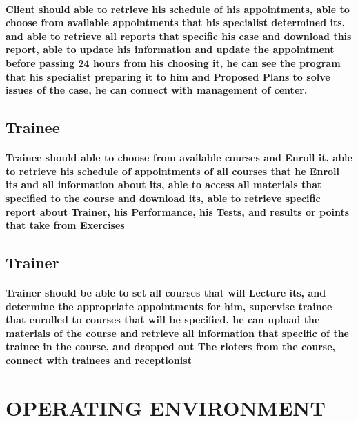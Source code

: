 \documentclass[../Psychological_system_web_application.tex]{subfiles}
\begin{document}
			\paragraph{Client should able to retrieve his schedule of his appointments, able to choose from available appointments that his specialist determined its, and able to retrieve all reports that specific his case and download this report, able to update his information and update the appointment before passing 24 hours from his choosing it, he can see the program that his specialist preparing it to him and Proposed Plans to solve issues of the case, he can connect with management of center.}
			
			\subsection{Trainee}
			\paragraph{Trainee should able to choose from available courses and Enroll it, able to retrieve his schedule of appointments of all courses that he Enroll its and all information about its, able to access all materials that specified to the course and download its, able to retrieve specific report about Trainer, his Performance, his Tests, and results or points that take from Exercises}
			
			\subsection{Trainer}
			\paragraph{Trainer should be able to set all courses that will Lecture its, and determine the appropriate appointments for him, supervise trainee that enrolled to courses that will be specified, he can upload the materials of the course and retrieve all information that specific of the trainee in the course, and dropped out The rioters from the course, connect with trainees and receptionist}
		
		\section{OPERATING ENVIRONMENT}
\end{document}
